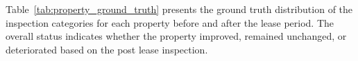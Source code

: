 Table~\ref{tab:property_ground_truth} presents the ground truth distribution of the inspection categories for each property before and after the lease period. The overall status indicates whether the property improved, remained unchanged, or deteriorated based on the post lease inspection.
